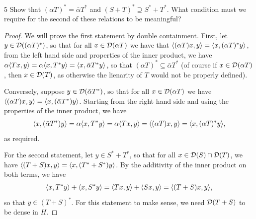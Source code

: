 \begin{exercise}{5}
Show that $(\alpha T)^\ast = \bar{\alpha} T^\ast$ and $(S + T)^\ast \supseteq S^\ast + T^\ast$.
What condition must we require for the second of these relations to be meaningful?
\end{exercise}
\begin{proof}
We will prove the first statement by double containment.
First, let $y \in \mathcal{D}((\alpha T)^\ast)$, so that for all $x \in \mathcal{D}(\alpha T)$ we have that $\langle (\alpha T) x, y\rangle = \langle x, (\alpha T)^\ast y\rangle$, from the left hand side and properties of the inner product, we have $\alpha \langle T x, y\rangle = \alpha \langle x, T^\ast y\rangle = \langle x, \bar{\alpha} T^\ast y\rangle$, so that $(\alpha T)^\ast \subseteq \bar{\alpha} T^\ast$ (of course if $x \in \mathcal{D}(\alpha T)$, then $x \in \mathcal{D}(T)$, as otherwise the lienarity of $T$ would not be properly defined).

Conversely, suppose $y \in \mathcal{D}(\bar{\alpha} T^\ast)$, so that for all $x \in \mathcal{D}(\alpha T)$ we have $\langle (\alpha T) x, y\rangle = \langle x, (\bar{\alpha} T^\ast) y\rangle$.
Starting from the right hand side and using the properties of the inner product, we have 
\begin{align*}
    \langle x, (\bar{\alpha} T^\ast) y\rangle 
    = \alpha \langle x, T^\ast y\rangle 
    = \alpha \langle Tx, y\rangle
    = \langle (\alpha T)x, y\rangle
    = \langle x, (\alpha T)^\ast y\rangle,
\end{align*}
as required.

For the second statement, let $y \in S^\ast + T^\ast$, so that for all $x \in \mathcal{D}(S) \cap \mathcal{D}(T)$, we have $\langle (T + S) x, y\rangle = \langle x, (T^\ast + S^\ast)y\rangle$.
By the additivity of the inner product on both terms, we have 
\begin{align*}
    \langle x, T^\ast y\rangle + \langle x, S^\ast y\rangle 
    = \langle T x, y\rangle + \langle Sx, y\rangle 
    = \langle (T + S)x, y\rangle,
\end{align*}
so that $y \in (T + S)^\ast$.
For this statement to make sense, we need $\mathcal{D}(T + S)$ to be dense in $H$.
\end{proof} 


